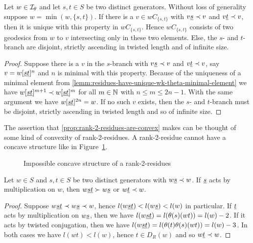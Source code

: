 \begin{prop}
	Let $w \in \mathcal{I}_{\theta}$ and let $s,t \in S$ be two distinct generators. Without loss of generality suppose $w = \min(w, \{s,t\})$. If there is a $v \in wC_{\{s,t\}}$ with $v \underline{s} \prec v$ and $v \underline{t} \prec v$, then it is unique with this property in $wC_{\{s,t\}}$. Hence $wC_{\{s,t\}}$ consists of two geodesics from $w$ to $v$ intersecting only in these two elements. Else, the $s$- and $t$-branch are disjoint, strictly ascending in twisted length and of infinite size.

	\begin{proof}
		Suppose there is a $v$ in the $s$-branch with $v \underline{s} \prec v$ and $v \underline{t} \prec v$, say $v = w[\underline{s} \underline{t}]^n$ and $n$ is minimal with this property. Because of the uniqueness of a minimal element from \ref{lemm:residues-have-unique-wk-theta-minimal-element} we have $w[\underline{s} \underline{t}]^{m+1} \prec w[\underline{s} \underline{t}]^m$ for all $m \in \mathbb{N}$ with $n \leq m \leq 2n - 1$. With the same argument we have $w[\underline{s} \underline{t}]^{2n} = w$. If no such $v$ exists, then the $s$- and $t$-branch must be disjoint, strictly ascending in twisted length and so of infinite size.
	\end{proof}
\end{prop}

The assertion that \ref{prop:rank-2-residues-are-convex} makes can be thought of some kind of convexity of rank-2-residues. A rank-2-residue cannot have a concave structure like in Figure~\ref{fig:concave-rank-2-residue}.

\begin{figure}[ht]
	\centering
	
	\caption{Impossible concave structure of a rank-2-residues}
	\label{fig:concave-rank-2-residue}
\end{figure}

\begin{lemm}
	Let $w \in S$ and $s,t \in S$ be two distinct generators with $w \underline{s} \prec w$. If $\underline{s}$ acts by multiplication on $w$, then $w \underline{s} \underline{t} \succ w \underline{s}$ or $w \underline{t} \prec w$.

	\begin{proof}
		Suppose $w \underline{s} \underline{t} \prec w \underline{s} \prec w$, hence $l(w \underline{s} \underline{t}) < l(w \underline{s}) < l(w)$ in particular. If $\underline{t}$ acts by multiplication on $w \underline{s}$, then we have $l(w \underline{s} \underline{t}) = l(\theta(s)(wt)) = l(w) - 2$. If it acts by twisted conjugation, then we have $l(w \underline{s} \underline{t}) = l(\theta(t)\theta(s)(wt)) = l(w) - 3$. In both cases we have $l(wt) < l(w)$, hence $t \in D_R(w)$ and so $w \underline{t} \prec w$.
	\end{proof}
\end{lemm}


